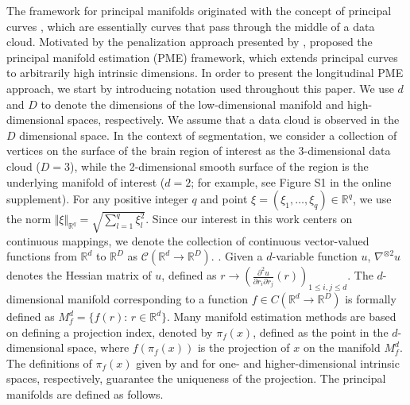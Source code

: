 \documentclass[12pt]{article}
\theoremstyle{definition}
\begin{document}
The framework for principal manifolds originated with the concept of principal curves \citep{hastie1989Principal}, which are essentially curves that pass through the middle of a data cloud. Motivated by the penalization approach presented by \cite{smola2001Regularized}, \cite{meng2021Principal} proposed the principal manifold estimation (PME) framework, which extends principal curves to arbitrarily high intrinsic dimensions. In order to present the longitudinal PME approach, we start by introducing notation used throughout this paper. We use $d$ and $D$ to denote the dimensions of the low-dimensional manifold and high-dimensional spaces, respectively. We assume that a data cloud is observed in the $D$ dimensional space. In the context of segmentation, we consider a collection of vertices on the surface of the brain region of interest as the 3-dimensional data cloud ($D=3$), while the 2-dimensional smooth surface of the region is the underlying manifold of interest ($d=2$; for example, see Figure S1 in the online supplement). For any positive integer $q$ and point $\xi=(\xi_1,\ldots,\xi_q)\in\mathbb{R}^q$, we use the norm $\Vert \xi\Vert_{\mathbb{R}^q}=\sqrt{\sum_{l=1}^q \xi_l^2}$. Since our interest in this work centers on continuous mappings, we denote the collection of continuous vector-valued functions from $\mathbb{R}^d$ to $\mathbb{R}^D$ as $\mathcal{C}(\mathbb{R}^{d} \to \mathbb{R}^{D})$. . Given a $d$-variable function $u$, $\nabla^{\otimes 2} u$ denotes the Hessian matrix of $u$, defined as $r \to \left( \frac{\partial ^2 u}{\partial r_i \partial r_j}(r) \right)_{1 \leq i, j \leq d}$. The $d$-dimensional manifold corresponding to a function $f \in C(\mathbb{R}^{d} \to \mathbb{R}^{D})$ is formally defined as $M_f^d=\{f(r):\,r\in\mathbb{R}^d\}$. Many manifold estimation methods are based on defining a projection index, denoted by $\pi_f(x)$, defined as the point in the $d$-dimensional space, where $f(\pi_f(x))$ is the projection of $x$ on the manifold $M_f^d$. The definitions of $\pi_f(x)$ given by \cite{hastie1989Principal} and \cite{meng2021Principal} for one- and higher-dimensional intrinsic spaces, respectively, guarantee the uniqueness of the projection. The principal manifolds are defined as follows.
\end{document}
